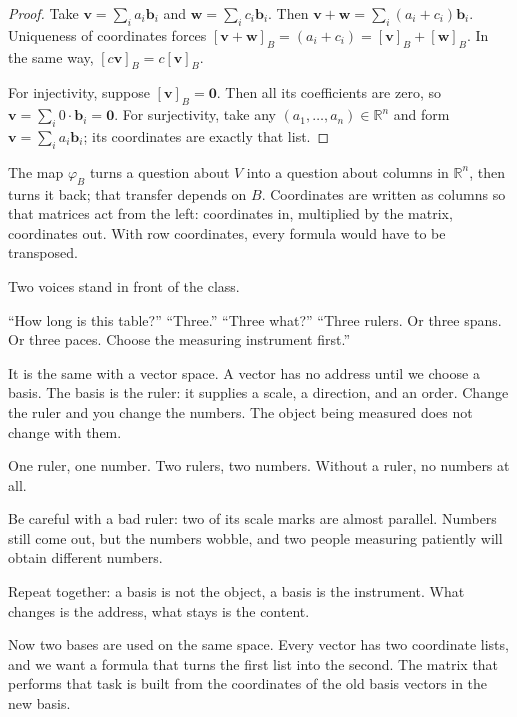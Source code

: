 \begin{proof}
Take $\mathbf{v}=\sum_{i}a_{i}\mathbf{b}_{i}$ and $\mathbf{w}=\sum_{i}c_{i}\mathbf{b}_{i}$.
Then $\mathbf{v}+\mathbf{w}=\sum_{i}(a_{i}+c_{i})\mathbf{b}_{i}$. Uniqueness of coordinates
forces $[\mathbf{v}+\mathbf{w}]_{B}=(a_{i}+c_{i})=[\mathbf{v}]_{B}+[\mathbf{w}]_{B}$.
In the same way, $[c\mathbf{v}]_{B}=c[\mathbf{v}]_{B}$.

For injectivity, suppose $[\mathbf{v}]_{B}=\mathbf{0}$. Then all its coefficients are zero,
so $\mathbf{v}=\sum_{i}0\cdot\mathbf{b}_{i}=\mathbf{0}$. For surjectivity, take
any $(a_{1},\dots,a_{n})\in\mathbb{R}^{n}$ and form
$\mathbf{v}=\sum_{i}a_{i}\mathbf{b}_{i}$; its coordinates are exactly that list.
\end{proof}

The map $\varphi_{B}$ turns a question about $V$ into a question about columns in
$\mathbb{R}^{n}$, then turns it back; that transfer depends on $B$. Coordinates
are written as columns so that matrices act from the left: coordinates in, multiplied by the
matrix, coordinates out. With row coordinates, every formula would have to be transposed.

\begin{bacakeras}
Two voices stand in front of the class.

``How long is this table?''
``Three.''
``Three what?''
``Three rulers. Or three spans. Or three paces. Choose the measuring instrument first.''

It is the same with a vector space. A vector has no address until we choose a basis. The basis
is
the ruler: it supplies a scale, a direction, and an order. Change the ruler and you change
the numbers. The object being measured does not change with them.

One ruler, one number. Two rulers, two numbers. Without a ruler, no numbers
at all.

Be careful with a bad ruler: two of its scale marks are almost parallel. Numbers still come
out,
but the numbers wobble, and two people measuring patiently will obtain different
numbers.

Repeat together: a basis is not the object, a basis is the instrument. What changes is the
address, what stays is the content.
\end{bacakeras}

Now two bases are used on the same space. Every vector has two coordinate lists,
and we want a formula that turns the first list into the second. The matrix that
performs that task is built from the coordinates of the old basis vectors in the new basis.

